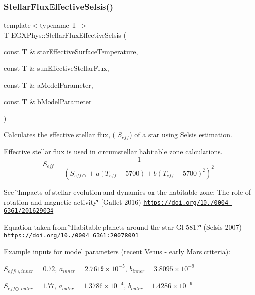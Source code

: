 \subsubsection{\texorpdfstring{Stellar\+Flux\+Effective\+Selsis()}{StellarFluxEffectiveSelsis()}}
{\footnotesize\ttfamily template$<$typename T $>$ \\
T E\+G\+X\+Phys\+::\+Stellar\+Flux\+Effective\+Selsis (\begin{DoxyParamCaption}\item[{const T \&}]{star\+Effective\+Surface\+Temperature,  }\item[{const T \&}]{sun\+Effective\+Stellar\+Flux,  }\item[{const T \&}]{a\+Model\+Parameter,  }\item[{const T \&}]{b\+Model\+Parameter }\end{DoxyParamCaption})}



Calculates the effective stellar flux, ( $S_{eff}$) of a star using Selsis estimation. 

Effective stellar flux is used in circumstellar habitable zone calculations. \[S_{eff}= \frac{1}{(S_{eff\odot}+a(T_{eff}-5700)+b(T_{eff}-5700)^2)^2}\]

See \char`\"{}\+Impacts of stellar evolution and dynamics on the habitable zone\+: The role of rotation and magnetic activity\char`\"{} (Gallet 2016) \href{https://doi.org/10.1051/0004-6361/201629034}{\tt https\+://doi.\+org/10./0004-\/6361/201629034}

Equation taken from \char`\"{}\+Habitable planets around the star Gl 581?\char`\"{} (Selsis 2007) \href{https://doi.org/10.1051/0004-6361:20078091}{\tt https\+://doi.\+org/10./0004-\/6361\+:20078091}

Example inputs for model parameters (recent Venus -\/ early Mars criteria)\+:

$S_{eff\odot,inner} = 0.72$, $a_{inner} = 2.7619 \times 10^{-5}$, $b_{inner} = 3.8095 \times 10^{-9}$

$S_{eff\odot,outer} = 1.77$, $a_{outer} = 1.3786 \times 10^{-4}$, $b_{outer} = 1.4286 \times 10^{-9}$


